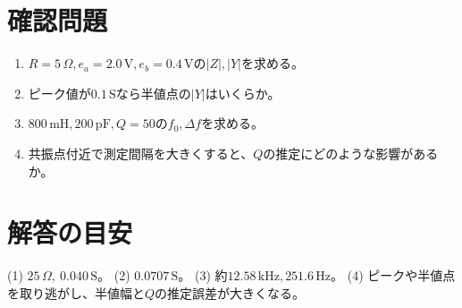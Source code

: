 \documentclass[lualatex,a4paper,10pt]{jlreq}
\begin{document}
\clearpage
\clearpage
\section{確認問題}\label{sec:auto8}
\begin{enumerate}
\item $R=5\,\Omega,e_a=2.0\,\mathrm{V},e_b=0.4\,\mathrm{V}$の$|Z|,|Y|$を求める。\answerline
\item ピーク値が$0.1\,\mathrm{S}$なら半値点の$|Y|$はいくらか。\answerline
\item $800\,\mathrm{mH},200\,\mathrm{pF},Q=50$の$f_0,\Delta f$を求める。\answerline
\item 共振点付近で測定間隔を大きくすると、$Q$の推定にどのような影響があるか。\answerline
\end{enumerate}
\section*{解答の目安}\label{sec:auto9}
(1) $25\,\Omega,\ 0.040\,\mathrm{S}$。
(2) $0.0707\,\mathrm{S}$。
(3) 約$12.58\,\mathrm{kHz},251.6\,\mathrm{Hz}$。
(4) ピークや半値点を取り逃がし、半値幅と$Q$の推定誤差が大きくなる。
\prelabclosing
\end{document}

